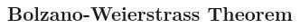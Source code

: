 \documentclass[8pt,landscape]{article}
\begin{document}
\begin{multicols}{3}


    \subsection{Bolzano-Weierstrass Theorem}








\end{multicols}
\end{document}

